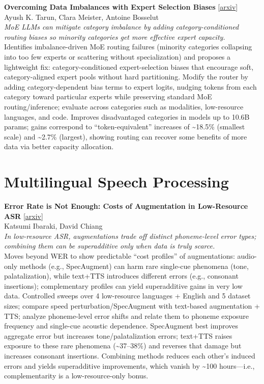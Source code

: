 \documentclass[12pt,letterpaper]{article}
\begin{document}
\medskip

{\small\textbf{Overcoming Data Imbalances with Expert Selection Biases}} {\scriptsize[\href{https://arxiv.org/abs/2610.13370}{arxiv}]}\\
{\scriptsize Ayush K. Tarun, Clara Meister, Antoine Bosselut}\\

{\small\textit{MoE LLMs can mitigate category imbalance by adding category-conditioned routing biases so minority categories get more effective expert capacity.}}\\[1pt]
{\footnotesize Identifies imbalance-driven MoE routing failures (minority categories collapsing into too few experts or scattering without specialization) and proposes a lightweight fix: category-conditioned expert-selection biases that encourage soft, category-aligned expert pools without hard partitioning. Modify the router by adding category-dependent bias terms to expert logits, nudging tokens from each category toward particular experts while preserving standard MoE routing/inference; evaluate across categories such as modalities, low-resource languages, and code. Improves disadvantaged categories in models up to 10.6B params; gains correspond to ``token-equivalent'' increases of \textasciitilde{}18.5\% (smallest scale) and \textasciitilde{}2.7\% (largest), showing routing can recover some benefits of more data via better capacity allocation.}

\medskip


\section*{Multilingual Speech Processing}

{\small\textbf{Error Rate is Not Enough: Costs of Augmentation in Low-Resource ASR}} {\scriptsize[\href{https://arxiv.org/abs/2610.13807}{arxiv}]}\\
{\scriptsize Katsumi Ibaraki, David Chiang}\\

{\small\textit{In low-resource ASR, augmentations trade off distinct phoneme-level error types; combining them can be superadditive only when data is truly scarce.}}\\[1pt]
{\footnotesize Moves beyond WER to show predictable ``cost profiles'' of augmentations: audio-only methods (e.g., SpecAugment) can harm rare single-cue phenomena (tone, palatalization), while text+TTS introduces different errors (e.g., consonant insertions); complementary profiles can yield superadditive gains in very low data. Controlled sweeps over 4 low-resource languages + English and 5 dataset sizes; compare speed perturbation/SpecAugment with text-based augmentation + TTS; analyze phoneme-level error shifts and relate them to phoneme exposure frequency and single-cue acoustic dependence. SpecAugment best improves aggregate error but increases tone/palatalization errors; text+TTS raises exposure to these rare phenomena (\textasciitilde{}37--38\%) and reverses that damage but increases consonant insertions. Combining methods reduces each other's induced errors and yields superadditive improvements, which vanish by \textasciitilde{}100 hours---i.e., complementarity is a low-resource-only bonus.}
\end{document}
